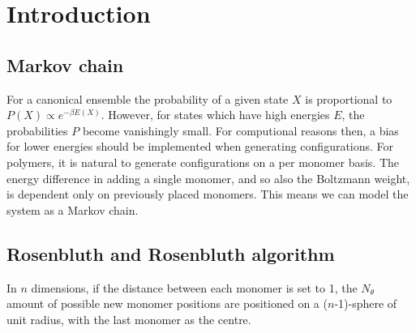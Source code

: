 \section{Introduction}


\subsection{Markov chain}
For a canonical ensemble the probability of a given state $X$ is proportional to $P(X) \propto e^{-\beta E(X)}$. However, for states which have high energies $E$, the probabilities $P$ become vanishingly small. For computional reasons then, a bias for lower energies should be implemented when generating configurations. For polymers, it is natural to generate configurations on a per monomer basis. The energy difference in adding a single monomer, and so also the Boltzmann weight, is dependent only on previously placed monomers. This means we can model the system as a Markov chain.

\subsection{Rosenbluth and Rosenbluth algorithm}
In $n$ dimensions, if the distance between each monomer is set to 1, the $N_{\theta}$ amount of possible new monomer positions are positioned on a ($n$-1)-sphere of unit radius, with the last monomer as the centre.